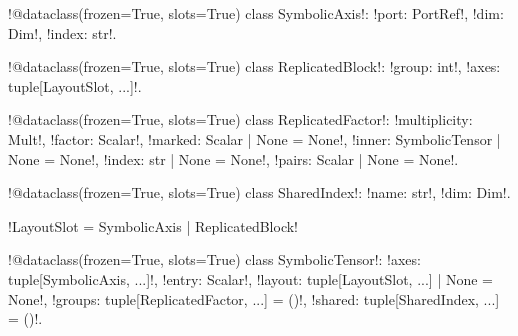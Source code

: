 \begin{signature}
\py!@dataclass(frozen=True, slots=True) class SymbolicAxis!: \py!port: PortRef!, \py!dim: Dim!, \py!index: str!.

\py!@dataclass(frozen=True, slots=True) class ReplicatedBlock!: \py!group: int!, \py!axes: tuple[LayoutSlot, ...]!.

\py!@dataclass(frozen=True, slots=True) class ReplicatedFactor!: \py!multiplicity: Mult!, \py!factor: Scalar!, \py!marked: Scalar | None = None!, \py!inner: SymbolicTensor | None = None!, \py!index: str | None = None!, \py!pairs: Scalar | None = None!.

\py!@dataclass(frozen=True, slots=True) class SharedIndex!: \py!name: str!, \py!dim: Dim!.

\py!LayoutSlot = SymbolicAxis | ReplicatedBlock!

\py!@dataclass(frozen=True, slots=True) class SymbolicTensor!: \py!axes: tuple[SymbolicAxis, ...]!, \py!entry: Scalar!, \py!layout: tuple[LayoutSlot, ...] | None = None!, \py!groups: tuple[ReplicatedFactor, ...] = ()!, \py!shared: tuple[SharedIndex, ...] = ()!.
\end{signature}

